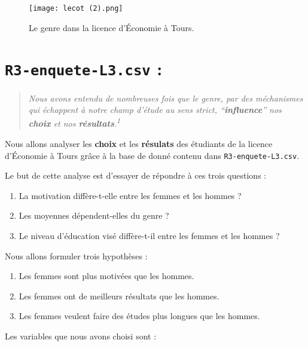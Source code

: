 \documentclass[
  11pt,
  french,
]{article}
\providecommand{\tightlist}{%
  \setlength{\itemsep}{0pt}\setlength{\parskip}{0pt}}
\begin{document}
\newpage

\begin{figure}
\centering
\texttt{[image: lecot (2).png]}
\caption{Le genre dans la licence d'Économie à Tours.}
\end{figure}

\hypertarget{r3-enquete-l3.csv}{%
\section{\texorpdfstring{\texttt{R3-enquete-L3.csv}
:}{R3-enquete-L3.csv :}}\label{r3-enquete-l3.csv}}

\begin{quote}
\emph{Nous avons entendu de nombreuses fois que le genre, par des
méchanismes qui échappent à notre champ d'étude au sens strict,
``\textbf{influence}'' nos \textbf{choix} et nos
\textbf{résultats}.\textsuperscript{1}}
\end{quote}

Nous allons analyser les \textbf{choix} et les \textbf{résulats} des
étudiants de la licence d'Économie à Tours grâce à la base de donné
contenu dans \texttt{R3-enquete-L3.csv}.

Le but de cette analyse est d'essayer de répondre à ces trois questions
:

\begin{enumerate}
\def\labelenumi{\arabic{enumi}.}
\tightlist
\item
  La motivation diffère-t-elle entre les femmes et les hommes ?
\item
  Les moyennes dépendent-elles du genre ?
\item
  Le niveau d'éducation visé diffère-t-il entre les femmes et les hommes
  ?
\end{enumerate}

Nous allons formuler trois hypothèses :

\begin{enumerate}
\def\labelenumi{\arabic{enumi}.}
\tightlist
\item
  Les femmes sont plus motivées que les hommes.
\item
  Les femmes ont de meilleurs résultats que les hommes.
\item
  Les femmes veulent faire des études plus longues que les hommes.
\end{enumerate}

Les variables que nous avons choisi sont :
\end{document}

